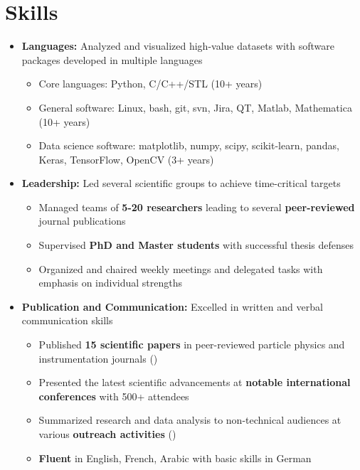 \documentclass{myfancycv}
\begin{document}
\section{Skills}
\begin{itemize}

\item {\textbf{Languages:} Analyzed and visualized high-value datasets with software packages developed in multiple languages
{\begin{itemize}\setlength\itemindent{-2.2em}
\item Core languages: Python, C/C++/STL (10+ years)
\item General software: Linux, bash, git, svn, Jira, QT, Matlab, Mathematica (10+ years)
\item Data science software: matplotlib, numpy, scipy, scikit-learn, pandas, Keras, TensorFlow, OpenCV (3+ years)
\end{itemize}
}
}

\vspace{6pt}

\item {\textbf{Leadership:} Led several scientific groups to achieve time-critical targets
{\begin{itemize}\setlength\itemindent{-2.2em}
    \item Managed teams of {\bf5-20 researchers} leading to several {\bf peer-reviewed} journal publications
    \item Supervised {\bf PhD and Master students} with successful thesis defenses
    \item Organized and chaired weekly meetings and delegated tasks with emphasis on individual strengths


\end{itemize}}%
}

\vspace{6pt}

\item{ \textbf{Publication and Communication:} Excelled in written and verbal communication skills
{\begin{itemize}\setlength\itemindent{-2.2em}
\item Published {\bf15 scientific papers} in peer-reviewed particle physics and instrumentation journals (\href{https://orcid.org/0000-0002-9169-0793}{})
    \item Presented the latest scientific advancements at {\bf notable international conferences} with 500+ attendees
    \item Summarized research and data analysis to non-technical audiences at various {\bf outreach activities} (\href{http://atlas.cern/updates/physics-briefing/probing-dark-matter-higgs-boson}{})
        \item {\bf Fluent} in English, French, Arabic with basic skills in German


\end{itemize}}}
\end{itemize}
\end{document}
